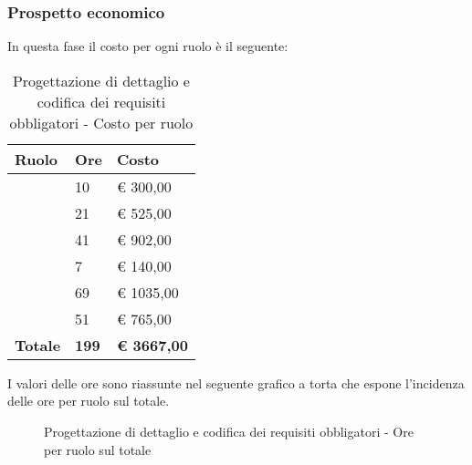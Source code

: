 		\subsubsection{Prospetto economico} %
		\label{ssub:prospetto_economico}
		In questa fase il costo per ogni ruolo è il seguente: \\
			\begin{table}[!ht]
				\begin{center}
					\begin{tabularx}{0.65\textwidth}{|l|l|X|}
						\hline
						\textbf{Ruolo} & \textbf{Ore} & \textbf{Costo} \\
						\hline
						\roleProjectManager & 10 & \euro{} 300,00 \\
						\hline
						\roleAnalyst & 21 & \euro{} 525,00 \\
						\hline
						\roleDesigner & 41 & \euro{} 902,00 \\
						\hline
						\roleAdministrator & 7 & \euro{} 140,00 \\
						\hline
						\roleProgrammer & 69 & \euro{} 1035,00 \\
						\hline
						\roleVerifier & 51 & \euro{} 765,00 \\
						\hline
						\textbf{Totale} & \textbf{199} & \textbf{\euro{} 3667,00} \\
						\hline
					\end{tabularx}
				\end{center}
			\caption{Progettazione di dettaglio e codifica dei requisiti obbligatori - Costo per ruolo}
			\end{table}
		
			\noindent
			I valori delle ore sono riassunte nel seguente grafico a torta che espone l’incidenza delle ore per ruolo sul totale.
			\begin{center}
				\begin{figure}[htbp]
				\vspace{0.8cm}
				\caption{Progettazione di dettaglio e codifica dei requisiti obbligatori - Ore per ruolo sul totale}
				\end{figure}
			\end{center}

